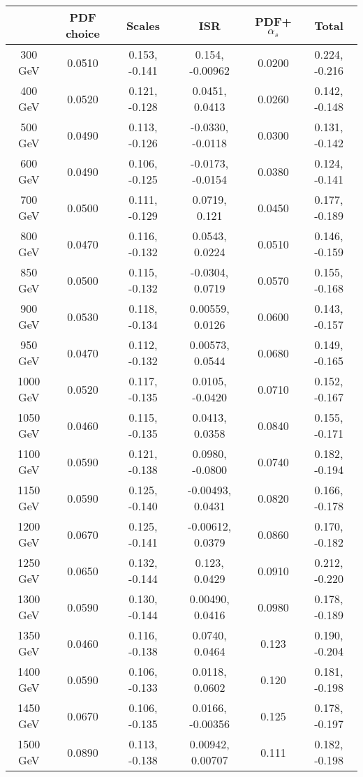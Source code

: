 \begin{table}
\centering
\small
\begin{tabular}{|c|c|c|c|c|c|}
\hline
       & PDF choice & Scales & ISR & PDF+$\alpha_s$ & Total \\
\hline
300 GeV  & 0.0510 & 0.153, -0.141 &  0.154, -0.00962 & 0.0200 & 0.224, -0.216 \\
400 GeV  & 0.0520 & 0.121, -0.128 &  0.0451,  0.0413 & 0.0260 & 0.142, -0.148 \\
500 GeV  & 0.0490 & 0.113, -0.126 & -0.0330, -0.0118 & 0.0300 & 0.131, -0.142 \\
600 GeV  & 0.0490 & 0.106, -0.125 & -0.0173, -0.0154 & 0.0380 & 0.124, -0.141 \\
700 GeV  & 0.0500 & 0.111, -0.129 &  0.0719,   0.121 & 0.0450 & 0.177, -0.189 \\
800 GeV  & 0.0470 & 0.116, -0.132 &  0.0543,  0.0224 & 0.0510 & 0.146, -0.159 \\
850 GeV  & 0.0500 & 0.115, -0.132 & -0.0304,  0.0719 & 0.0570 & 0.155, -0.168 \\
900 GeV  & 0.0530 & 0.118, -0.134 & 0.00559,  0.0126 & 0.0600 & 0.143, -0.157 \\
950 GeV  & 0.0470 & 0.112, -0.132 & 0.00573,  0.0544 & 0.0680 & 0.149, -0.165 \\
1000 GeV & 0.0520 & 0.117, -0.135 &  0.0105, -0.0420 & 0.0710 & 0.152, -0.167 \\
1050 GeV & 0.0460 & 0.115, -0.135 &  0.0413,  0.0358 & 0.0840 & 0.155, -0.171 \\
1100 GeV & 0.0590 & 0.121, -0.138 &  0.0980, -0.0800 & 0.0740 & 0.182, -0.194 \\
1150 GeV & 0.0590 & 0.125, -0.140 & -0.00493, 0.0431 & 0.0820 & 0.166, -0.178 \\
1200 GeV & 0.0670 & 0.125, -0.141 & -0.00612, 0.0379 & 0.0860 & 0.170, -0.182 \\
1250 GeV & 0.0650 & 0.132, -0.144 &   0.123,  0.0429 & 0.0910 & 0.212, -0.220 \\
1300 GeV & 0.0590 & 0.130, -0.144 & 0.00490,  0.0416 & 0.0980 & 0.178, -0.189 \\
1350 GeV & 0.0460 & 0.116, -0.138 &  0.0740,  0.0464 &  0.123 & 0.190, -0.204 \\
1400 GeV & 0.0590 & 0.106, -0.133 &  0.0118,  0.0602 &  0.120 & 0.181, -0.198 \\
1450 GeV & 0.0670 & 0.106, -0.135 & 0.0166, -0.00356 &  0.125 & 0.178, -0.197 \\
1500 GeV & 0.0890 & 0.113, -0.138 & 0.00942, 0.00707 &  0.111 & 0.182, -0.198 \\

\end{tabular}
\end{table}
